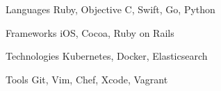 

\begin{cvskills}

  \cvskill
    {Languages} %
    {Ruby, Objective C, Swift, Go, Python} %
    
  \cvskill
    {Frameworks} %
    {iOS, Cocoa, Ruby on Rails} %
    
  \cvskill
    {Technologies} %
    {Kubernetes, Docker, Elasticsearch} %

  \cvskill
    {Tools} %
    {Git, Vim, Chef, Xcode, Vagrant} %

\end{cvskills}
